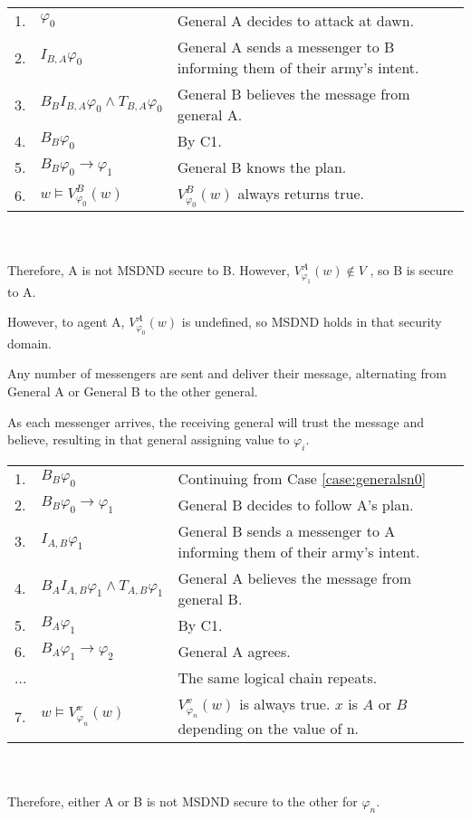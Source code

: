 \begin{table}[h!]
\centering
\small
\begin{tabularx}{\linewidth}{l l X}
1. & $\varphi_0$ & General A decides to attack at dawn. \\
2. & $I_{B,A} \varphi_0$ & General A sends a messenger to B informing them of their army's intent. \\
3. & $B_{B}I_{B,A} \varphi_0 \wedge T_{B,A} \varphi_0$ & General B believes the message from general A. \\
4. & $B_{B} \varphi_0$ & By C1. \\
5. & $B_{B} \varphi_0 \rightarrow \varphi_1$ & General B knows the plan. \\
6. & $w \vDash V_{\varphi_0}^{B}(w)$ & $V_{\varphi_0}^{B}(w)$ always returns true. \\
\end{tabularx} \\~\\
Therefore, A is not MSDND secure to B. However, $V_{\varphi_1}^{A}(w) \not \in V$ , so B is secure to A.
\label{tab:twoarmiesproof}
\end{table}

However, to agent A, $V_{\varphi_{0}}^A(w)$ is undefined, so MSDND holds in that security domain. 

\begin{case}
Any number of messengers are sent and deliver their message, alternating from General A or General B to the other general. \label{case:generalsnn}
\end{case}

As each messenger arrives, the receiving general will trust the message and believe, resulting in that general assigning value to $\varphi_i$.

\begin{table}[h!]
\centering
\small
\begin{tabularx}{\linewidth}{l l X}
1. & $B_{B} \varphi_0$ & Continuing from Case \ref{case:generalsn0} \\
2. & $B_{B} \varphi_0 \rightarrow \varphi_1$ & General B decides to follow A's plan. \\
3. & $I_{A,B} \varphi_1$ & General B sends a messenger to A informing them of their army's intent. \\
4. & $B_{A}I_{A,B} \varphi_1 \wedge T_{A,B} \varphi_1$ & General A believes the message from general B. \\
5. & $B_{A}\varphi_1$ & By C1. \\
6. & $B_{A}\varphi_1 \rightarrow \varphi_2$ & General A agrees. \\
...& & The same logical chain repeats. \\
7. & $w \vDash V_{\varphi_n}^{x}(w)$ & $V_{\varphi_n}^{x}(w)$ is always true. $x$ is $A$ or $B$ depending on the value of n. %
\end{tabularx} \\~\\
Therefore, either A or B is not MSDND secure to the other for $\varphi_n$.
\label{tab:twoarmiesproof2}
\end{table}

